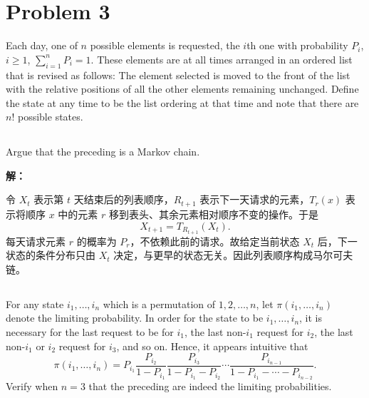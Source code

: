 \documentclass[12pt,a4paper]{article}
\begin{document}
\section{Problem 3}
Each day, one of $n$ possible elements is requested, the $i$th one with probability $P_i$, $i\ge 1$, $\sum_{i=1}^{n}P_i=1$. These elements are at all times arranged in an ordered list that is revised as follows: The element selected is moved to the front of the list with the relative positions of all the other elements remaining unchanged. Define the state at any time to be the list ordering at that time and note that there are $n!$ possible states.


\subsection{}
Argue that the preceding is a Markov chain.

\begin{answerbox}
\textbf{解：}

令 $X_t$ 表示第 $t$ 天结束后的列表顺序，$R_{t+1}$ 表示下一天请求的元素，$T_r(x)$ 表示将顺序 $x$ 中的元素 $r$ 移到表头、其余元素相对顺序不变的操作。于是
\[
X_{t+1}=T_{R_{t+1}}(X_t).
\]
每天请求元素 $r$ 的概率为 $P_r$，不依赖此前的请求。故给定当前状态 $X_t$ 后，下一状态的条件分布只由 $X_t$ 决定，与更早的状态无关。因此列表顺序构成马尔可夫链。
\end{answerbox}

\subsection{}
For any state $i_1,\ldots,i_n$ which is a permutation of $1,2,\ldots,n$, let $\pi(i_1,\ldots,i_n)$ denote the limiting probability. In order for the state to be $i_1,\ldots,i_n$, it is necessary for the last request to be for $i_1$, the last non-$i_1$ request for $i_2$, the last non-$i_1$ or $i_2$ request for $i_3$, and so on. Hence, it appears intuitive that
\[
\pi(i_1,\ldots,i_n)=P_{i_1}\frac{P_{i_2}}{1-P_{i_1}}\frac{P_{i_3}}{1-P_{i_1}-P_{i_2}}\cdots\frac{P_{i_{n-1}}}{1-P_{i_1}-\cdots-P_{i_{n-2}}}.
\]
Verify when $n=3$ that the preceding are indeed the limiting probabilities.
\end{document}

